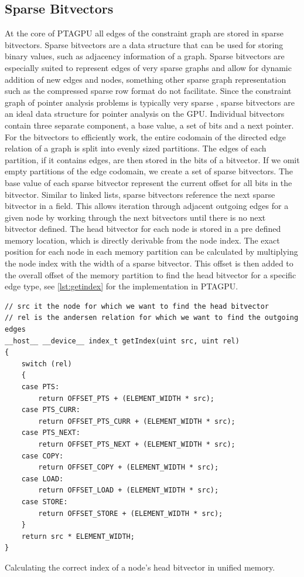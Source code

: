 \subsection{Sparse Bitvectors}
At the core of PTAGPU all edges of the constraint graph are stored in sparse bitvectors.
Sparse bitvectors are a data structure that can be used for storing binary values, such as adjacency information of a graph. Sparse bitvectors are especially suited to represent edges of very sparse graphs and allow for dynamic addition of new edges and nodes, something other sparse graph representation such as the compressed sparse row format do not facilitate. Since the constraint graph of pointer analysis problems is typically very sparse \cite{mendez2012gpu}, sparse bitvectors are an ideal data structure for pointer analysis on the GPU.
Individual bitvectors contain three separate component, a base value, a set of bits and a next pointer.
For the bitvectors to efficiently work, the entire codomain of the directed edge relation of a graph is split into evenly sized partitions.
The edges of each partition, if it contains edges, are then stored in the bits of a bitvector. If we omit empty partitions of the edge codomain, we create a set of sparse bitvectors.
The base value of each sparse bitvector represent the current offset for all bits in the bitvector.
Similar to linked lists, sparse bitvectors reference the next sparse bitvector in a field. This allows iteration through adjacent outgoing edges for a given node by working through the next bitvectors until there is no next bitvector defined.
The head bitvector for each node is stored in a pre defined memory location, which is directly derivable from the node index.
The exact position for each node in each memory partition can be calculated by multiplying the node index with the width of a sparse bitvector. This offset is then added to the overall offset of the memory partition to find the head bitvector for a specific edge type, see \autoref{lst:getindex} for the implementation in PTAGPU.
\begin{listing}
    \begin{verbatim}
// src it the node for which we want to find the head bitvector
// rel is the andersen relation for which we want to find the outgoing edges
__host__ __device__ index_t getIndex(uint src, uint rel)
{
    switch (rel)
    {
    case PTS:
        return OFFSET_PTS + (ELEMENT_WIDTH * src);
    case PTS_CURR:
        return OFFSET_PTS_CURR + (ELEMENT_WIDTH * src);
    case PTS_NEXT:
        return OFFSET_PTS_NEXT + (ELEMENT_WIDTH * src);
    case COPY:
        return OFFSET_COPY + (ELEMENT_WIDTH * src);
    case LOAD:
        return OFFSET_LOAD + (ELEMENT_WIDTH * src);
    case STORE:
        return OFFSET_STORE + (ELEMENT_WIDTH * src);
    }
    return src * ELEMENT_WIDTH;
}
    \end{verbatim}
    \caption{Calculating the correct index of a node's head bitvector in unified memory.}
    \label{lst:getindex}
\end{listing}
